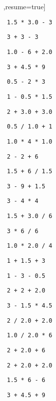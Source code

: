 \begin{exercise}
\begin{sltasks}[counter-format=1.tsk[1],resume=true]
\begin{items}
      \item \texttt{ 1.5 * 3.0 - 3 }
    \end{items}
    \task
    \begin{items}
      \item \texttt{ 3 + 3 - 3 }
      \item \texttt{ 1.0 - 6 + 2.0 }
      \item \texttt{ 3 + 4.5 * 9 }
      \item \texttt{ 0.5 - 2 * 3 }
      \item \texttt{ 1 - 0.5 * 1.5 }
    \end{items}
    \task
    \begin{items}
      \item \texttt{ 2 + 3.0 + 3.0 }
      \item \texttt{ 0.5 / 1.0 + 1 }
      \item \texttt{ 1.0 * 4 * 1.0 }
      \item \texttt{ 2 - 2 + 6 }
      \item \texttt{ 1.5 + 6 / 1.5 }
    \end{items}
    \task
    \begin{items}
      \item \texttt{ 3 - 9 + 1.5 }
      \item \texttt{ 3 - 4 * 4 }
      \item \texttt{ 1.5 + 3.0 / 6 }
      \item \texttt{ 3 * 6 / 6 }
      \item \texttt{ 1.0 * 2.0 / 4 }
    \end{items}
    \task
    \begin{items}
      \item \texttt{ 1 + 1.5 + 3 }
      \item \texttt{ 1 - 3 - 0.5 }
      \item \texttt{ 2 + 2 + 2.0 }
      \item \texttt{ 3 - 1.5 * 4.5 }
      \item \texttt{ 2 / 2.0 + 2.0 }
    \end{items}
    \task
    \begin{items}
      \item \texttt{ 1.0 / 2.0 * 6 }
      \item \texttt{ 2 + 2.0 + 6 }
      \item \texttt{ 2 + 2.0 + 2.0 }
      \item \texttt{ 1.5 * 6 - 6 }
      \item \texttt{ 3 + 4.5 + 9 }
    \end{items}
\end{sltasks}
\end{exercise}

